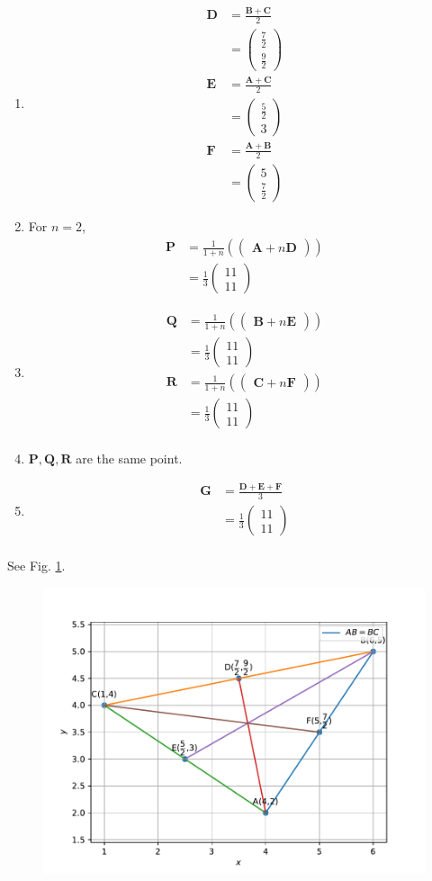 \documentclass[12pt]{article}
\providecommand{\brak}[1]{\ensuremath{\left(#1\right)}}
\newcommand{\myvec}[1]{\ensuremath{\begin{pmatrix}#1\end{pmatrix}}}
\let\vec\mathbf
\begin{document}
\begin{enumerate}
\item 
\begin{align}
\vec{D}&=\frac{\vec{B}+\vec{C}}{2}\\
&=\myvec{\frac{7}{2}\\[2pt] \frac{9}{2}}\\
\vec{E}&=\frac{\vec{A}+\vec{C}}{2}\\
&=\myvec{\frac{5}{2}\\ 3}\\
\vec{F}&=\frac{\vec{A}+\vec{B}}{2}\\
&=\myvec{5\\ \frac{7}{2}}
\end{align}

\item 
	For
$n=2$,
\begin{align}
\vec{P}&=\frac{1}{1+n}\brak{\myvec{\vec{A}+n\vec{D}}}\\
&=\frac{1}{3}\myvec{11\\11}
\end{align}

\item 
\begin{align}
\vec{Q}&=\frac{1}{1+n}\brak{\myvec{\vec{B}+n\vec{E}}}\\
&=\frac{1}{3}\myvec{11\\11}\\
\vec{R}&=\frac{1}{1+n}\brak{\myvec{\vec{C}+n\vec{F}}}\\
&=\frac{1}{3}\myvec{11\\11}\\
\end{align}

\item 
 $\vec{P},\vec{Q},\vec{R}$ are the same point.
   
\item 
\begin{align}
\vec{G}&=\frac{\vec{D}+\vec{E}+\vec{F}}{3}\\
&=\frac{1}{3}\myvec{11\\11}\\
\end{align} 
\end{enumerate}
See Fig.  
  \ref{fig:chapters/10/7/4/7/Figure}.
\begin{figure}[h!]
\centering
\includegraphics[width=\columnwidth]{chapters/10/7/4/7/figs/dj.pdf}
\caption{}
  \label{fig:chapters/10/7/4/7/Figure}
\end{figure}
\end{document}
